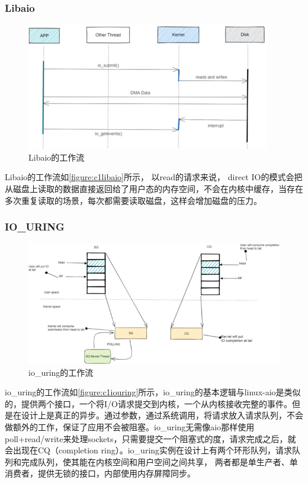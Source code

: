 \subsubsection{Libaio}

\begin{figure}[htb]
    \figureCapSet
    \centering
    \includegraphics[width=.8\linewidth]{figure/c1/libaio.png}
    \caption{Libaio的工作流}
    \label{figure:c1libaio}
\end{figure}

Libaio的工作流如\autoref{figure:c1libaio}所示， 以read的请求来说， direct IO的模式会把从磁盘上读取的数据直接返回给了用户态的内存空间，不会在内核中缓存，当存在多次重复读取的场景，每次都需要读取磁盘，这样会增加磁盘的压力。


\subsubsection{IO\_URING}

\begin{figure}[htb]
    \figureCapSet
    \centering
    \includegraphics[width=.8\linewidth]{figure/c1/iouring.png}
    \caption{io\_uring的工作流}
    \label{figure:c1iouring}
\end{figure}

io\_uring的工作流如\autoref{figure:c1iouring}所示，io\_uring的基本逻辑与linux-aio是类似的，提供两个接口，一个将I/O请求提交到内核，一个从内核接收完整的事件。但是在设计上是真正的异步。通过参数，通过系统调用，将请求放入请求队列，不会做额外的工作，保证了应用不会被阻塞。io\_uring无需像aio那样使用 poll+read/write来处理sockets，只需要提交一个阻塞式的度，请求完成之后，就会出现在CQ（completion ring）。io\_uring实例在设计上有两个环形队列，请求队列和完成队列，使其能在内核空间和用户空间之间共享， 两者都是单生产者、单消费者，提供无锁的接口，内部使用内存屏障同步。

